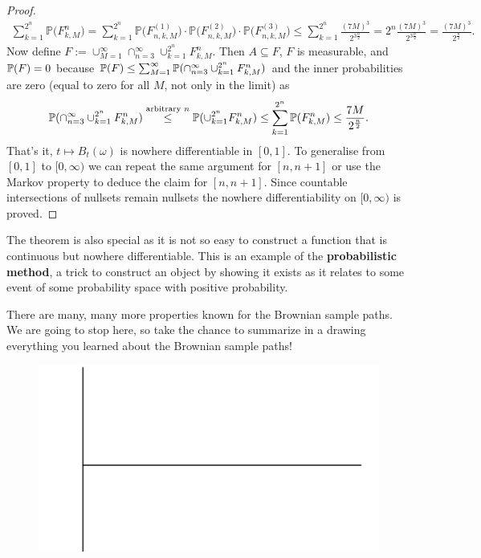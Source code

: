 \begin{proof}[Proof]
	\begin{align*}
		 \sum_{k=1}^{2^n} \mathbb{P}\big(F^n_{k,M}\big)
		 =\sum_{k=1}^{2^n} \mathbb{P}\big(F_{n,k,M}^{(1)}\big) \cdot \mathbb{P}\big(F_{n,k,M}^{(2)}\big) \cdot \mathbb{P}\big(F_{n,k,M}^{(3)}\big) 
		\leq  \sum_{k=1}^{2^n} \frac{(7M)^3}{2^{3\frac{n}{2}}} 
		=  2^n \frac{(7M)^3}{2^{3\frac{n}{2}}} = \frac{(7M)^3}{2^{\frac{n}{2}}}.
	\end{align*}
	Now define $F:=\cup_{M=1}^\infty\cap_{n=3}^\infty \cup_{k=1}^{2^n}F^n_{k,M}$. Then $A\subseteq F$, $F$ is measurable, and $\P(F)=0$ because $\P(F)\leq \sum_{M=1}^\infty \P(\cap_{n=3}^\infty \cup_{k=1}^{2^n}F^n_{k,M})$ and the inner probabilities are zero (equal to zero for all $M$, not only in the limit) as
	\begin{align*}
		\P(\cap_{n=3}^\infty \cup_{k=1}^{2^n}F^n_{k,M})\overset{\text{arbitrary $n$}}{\leq} \P(\cup_{k=1}^{2^n}F^n_{k,M})\leq \sum_{k=1}^{2^n}\P(F^n_{k,M})\leq \frac{7M}{2^{\frac{n}{2}}}.
	\end{align*}
	That's it, $t\mapsto B_t(\omega)$ is nowhere differentiable in $[0,1]$. To generalise from $[0,1]$ to $[0,\infty)$ we can repeat the same argument for $[n,n+1]$ or use the Markov property to deduce the claim for $[n,n+1]$. Since countable intersections of nullsets remain nullsets the nowhere differentiability on $[0,\infty)$ is proved.
\end{proof}
The theorem is also special as it is not so easy to construct a function that is continuous but nowhere differentiable. This is an example of the \textbf{probabilistic method}, a trick to construct an object by showing it exists as it relates to some event of some probability space with positive probability.\smallskip

There are many, many more properties known for the Brownian sample paths. We are going to stop here, so take the chance to summarize in a drawing everything you learned about the Brownian sample paths!
\begin{figure}[h]
	\begin{center}
		\includegraphics[scale=0.1]{BrownianBild.jpeg}
	\end{center}
\end{figure}
